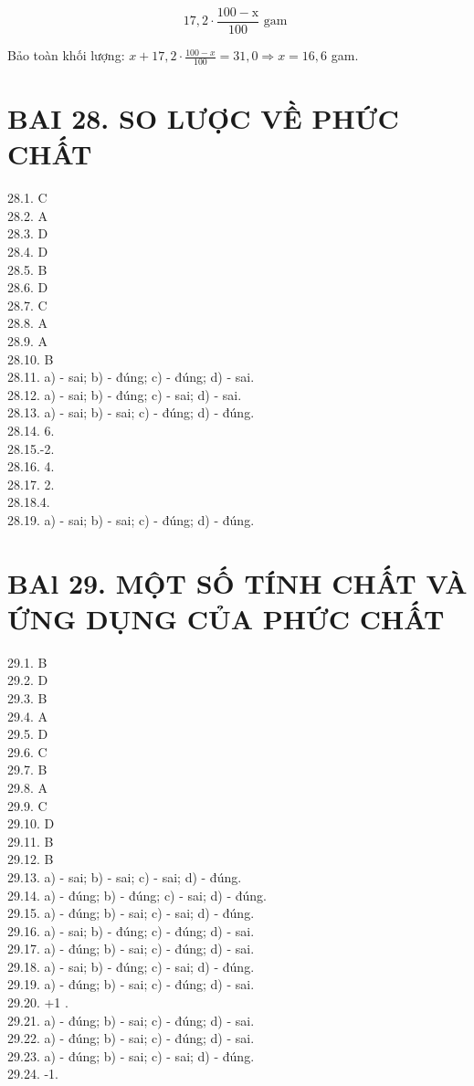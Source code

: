 \documentclass[10pt]{article}
\begin{document}
$$
17,2 \cdot \frac{100-\mathrm{x}}{100} \text { gam }
$$

Bảo toàn khối lượng: $x+17,2 \cdot \frac{100-x}{100}=31,0 \Rightarrow x=16,6$ gam.

\section*{BAI 28. SO LƯỢC VỀ PHỨC CHẤT}
28.1. C\\
28.2. A\\
28.3. D\\
28.4. D\\
28.5. B\\
28.6. D\\
28.7. C\\
28.8. A\\
28.9. A\\
28.10. B\\
28.11. a) - sai; b) - đúng; c) - đúng; d) - sai.\\
28.12. a) - sai; b) - đúng; c) - sai; d) - sai.\\
28.13. a) - sai; b) - sai; c) - đúng; d) - đúng.\\
28.14. 6.\\
28.15.-2.\\
28.16. 4.\\
28.17. 2.\\
28.18.4.\\
28.19. a) - sai; b) - sai; c) - đúng; d) - đúng.

\section*{BAl 29. MỘT SỐ TÍNH CHẤT VÀ ỨNG DỤNG CỦA PHỨC CHẤT}
29.1. B\\
29.2. D\\
29.3. B\\
29.4. A\\
29.5. D\\
29.6. C\\
29.7. B\\
29.8. A\\
29.9. C\\
29.10. D\\
29.11. B\\
29.12. B\\
29.13. a) - sai; b) - sai; c) - sai; d) - đúng.\\
29.14. a) - đúng; b) - đúng; c) - sai; d) - đúng.\\
29.15. a) - đúng; b) - sai; c) - sai; d) - đúng.\\
29.16. a) - sai; b) - đúng; c) - đúng; d) - sai.\\
29.17. a) - đúng; b) - sai; c) - đúng; d) - sai.\\
29.18. a) - sai; b) - đúng; c) - sai; d) - đúng.\\
29.19. a) - đúng; b) - sai; c) - đúng; d) - sai.\\
29.20. +1 .\\
29.21. a) - đúng; b) - sai; c) - đúng; d) - sai.\\
29.22. a) - đúng; b) - sai; c) - đúng; d) - sai.\\
29.23. a) - đúng; b) - sai; c) - sai; d) - đúng.\\
29.24. -1.
\end{document}
